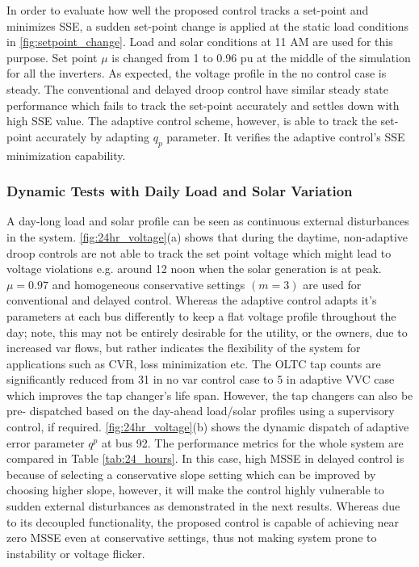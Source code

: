 \documentclass[journal]{IEEEtran}
\begin{document}
In order to evaluate how well the proposed control tracks a set-point and minimizes SSE, a sudden set-point change is applied at the static load conditions in \figurename \ref{fig:setpoint_change}. Load and solar conditions at 11 AM are used for this purpose. %
Set point $\mu$ is changed from 1 to 0.96 pu at the middle of the simulation for all the inverters. As expected, the voltage profile in the no control case is steady. The conventional and delayed droop control have similar steady state performance which fails to track the set-point accurately and settles down with high SSE value. The adaptive control scheme, however, is able to track the set-point accurately by adapting $q_p$ parameter. It verifies the adaptive control's SSE minimization capability.

\subsubsection{Dynamic Tests with Daily Load and Solar Variation}
A day-long load and solar profile can be seen as continuous external disturbances in the system. \figurename\ref{fig:24hr_voltage}(a) shows that during the daytime, non-adaptive droop controls are not able to track the set point voltage which might lead to voltage violations e.g. around 12 noon when the solar generation is at peak. $\mu=0.97$ and homogeneous conservative settings $(m=3)$ are used for conventional and delayed control. Whereas the adaptive control  adapts it’s parameters at each bus differently to keep a flat voltage profile throughout the day; note, this may not be entirely desirable for the utility, or the owners, due to increased var flows, but rather indicates the flexibility of the system for applications such as CVR, loss minimization etc. {The OLTC tap counts are significantly reduced from 31 in no var control case to 5 in adaptive VVC case which improves the tap changer's life span. However, the tap changers can also be pre- dispatched based on the day-ahead load/solar profiles using a supervisory control, if required.} \figurename\ref{fig:24hr_voltage}(b) shows the dynamic dispatch of adaptive error parameter $q^p$ at bus 92. The performance metrics for the whole system are compared in Table \ref{tab:24_hours}. In this case, high MSSE in delayed control is because of selecting a conservative slope setting which can be improved by choosing higher slope, however, it will make the control highly vulnerable to sudden external disturbances as demonstrated in the next results. Whereas due to its decoupled functionality, the proposed control is capable of achieving near zero MSSE even at conservative settings, thus not making system prone to instability or voltage flicker.
\end{document}
